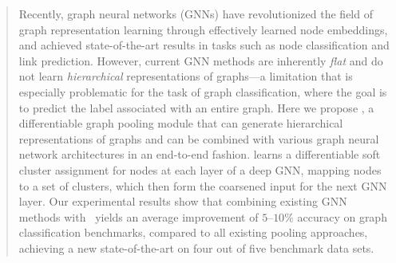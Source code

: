 \begin{abstract}
Recently, graph neural networks (GNNs) have revolutionized the field of graph representation learning through effectively learned node embeddings, and achieved state-of-the-art results in tasks such as node classification and link prediction. However, current GNN methods are inherently {\em flat} and do not learn {\em hierarchical} representations of graphs---a limitation that is especially problematic for the task of graph classification, where the goal is to predict the label associated with an entire graph.
Here we propose \name, a differentiable graph pooling module that can generate hierarchical representations of graphs and can be combined with various graph neural network architectures in an end-to-end fashion. 
\name learns a differentiable soft cluster assignment for nodes at each layer of a deep GNN, mapping nodes to a set of clusters, which then form the coarsened input for the next GNN layer.
Our experimental results show that combining existing GNN methods with \name\ yields an average improvement of $5$--$10\%$ accuracy on graph classification benchmarks, compared to all existing pooling approaches, achieving a new state-of-the-art on four out of five benchmark data sets.   
\end{abstract}
